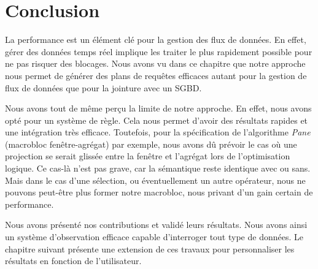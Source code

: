 \section{Conclusion}\label{sec:valid:perfs:conclusion}
La performance est un élément clé pour la gestion des flux de données. En effet, gérer des données temps réel implique les traiter le plus rapidement possible pour ne pas risquer des blocages. Nous avons vu dans ce chapitre que notre approche nous permet de générer des plans de requêtes efficaces autant pour la gestion de flux de données que pour la jointure avec un SGBD.

Nous avons tout de même perçu la limite de notre approche. En effet, nous avons opté pour un système de règle. Cela nous permet d'avoir des résultats rapides et une intégration très efficace. Toutefois, pour la spécification de l'algorithme \textit{Pane} (macrobloc fenêtre-agrégat) par exemple, nous avons dû prévoir le cas où une projection se serait glissée entre la fenêtre et l'agrégat lors de l'optimisation logique. Ce cas-là n'est pas grave, car la sémantique reste identique avec ou sans. Mais dans le cas d'une sélection, ou éventuellement un autre opérateur, nous ne pouvons peut-être plus former notre macrobloc, nous privant d'un gain certain de performance.

Nous avons présenté nos contributions et validé leurs résultats. Nous avons ainsi un système d'observation efficace capable d'interroger tout type de données. Le chapitre suivant présente une extension de ces travaux pour personnaliser les résultats en fonction de l'utilisateur.
